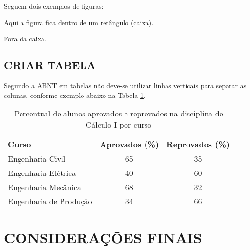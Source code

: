 \documentclass[
	12pt,				%
	oneside,			%
	a4paper,			%
	english,			%
	french,				%
	spanish,			%
	brazil,				%
	]{abntex2}
\theoremstyle{plain}
\theoremstyle{definition}
\begin{document}
Seguem dois exemplos de figuras:

Aqui a figura fica dentro de um retângulo (caixa).


Fora da caixa.





\section{CRIAR TABELA}

Segundo a ABNT em tabelas não deve-se utilizar linhas verticais para separar as colunas, conforme exemplo abaixo na Tabela \ref{tabelaABNT}. 

\begin{table}[!h]
	\centering
	\caption{Percentual de alunos aprovados e reprovados na disciplina de Cálculo I por curso}
	\label{tabelaABNT}
	\begin{tabular}{l c c} \hline
		\textbf{Curso}   &   \textbf{Aprovados (\%)}   &   \textbf{Reprovados (\%)}  \\  \hline
		Engenharia Civil   &  65  &  35   \\   
		Engenharia Elétrica &  40  &  60   \\ 
		Engenharia Mecânica   & 68 & 32 \\
		Engenharia de Produção & 34 &  66\\ \hline
	\end{tabular}
	
\end{table}






\chapter*[Conclusão]{CONSIDERAÇÕES FINAIS}
\end{document}
